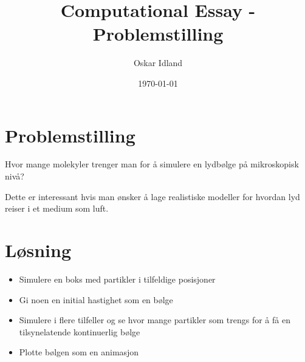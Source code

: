 \documentclass[a4paper]{article}
\title{Computational Essay - Problemstilling}
\author{Oskar Idland}
\date{\today}
\begin{document}
\maketitle
  
\section*{Problemstilling}

Hvor mange molekyler trenger man for å simulere en lydbølge på mikroskopisk nivå?\newline

Dette er interessant hvis man ønsker å lage realistiske modeller for hvordan lyd reiser i et medium som luft. 

\section*{Løsning}
\begin{itemize}
    \item Simulere en boks med partikler i tilfeldige posisjoner
    \item Gi noen en initial hastighet som en bølge
    \item Simulere i flere tilfeller og se hvor mange partikler som trengs for å få en tilsynelatende kontinuerlig bølge 
    \item Plotte bølgen som en animasjon
\end{itemize}
\end{document}
